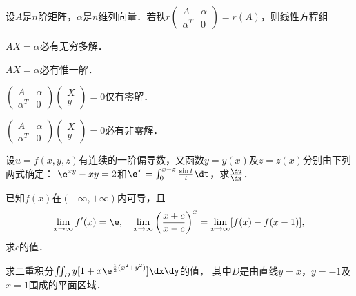 \documentclass[plain,noanswer,medmath]{../../template/jnuexam}
\begin{document}
\begin{problem}
设$A$是$n$阶矩阵，$\alpha$是$n$维列向量．若秩$r\begin{pmatrix}
         A & \alpha \\
  \alpha^T & 0
\end{pmatrix} = r(A)$，则线性方程组\pickout{}
\begin{abcd}
\item $AX = \alpha$必有无穷多解．
\item $AX = \alpha$必有惟一解．
\item $\begin{pmatrix}
         A & \alpha \\
  \alpha^T & 0
\end{pmatrix}\begin{pmatrix}
  X \\
  y
\end{pmatrix} = 0$仅有零解．
\item $\begin{pmatrix}
         A & \alpha \\
  \alpha^T & 0
\end{pmatrix}\begin{pmatrix}
  X \\
  y
\end{pmatrix} = 0$必有非零解．
\end{abcd}
\end{problem}





\begin{problem}
设$u = f(x,y,z)$有连续的一阶偏导数，又函数$y = y(x)$及$z = z(x)$分别由下列两式确定：
$\e^{xy} - xy = 2$和$\e^x = \int_0^{x - z} \frac{\sin t}{t} \dt$，求$\frac{\du}{\dx}$．
\end{problem}



\begin{problem}
已知$f(x)$在$(-\infty , +\infty)$内可导，且
$$\lim_{x \to \infty} f'(x) = \e,\quad
  \lim_{x \to \infty} \left(\frac{x + c}{x - c} \right)^x= \lim_{x \to \infty} [f(x) - f(x - 1)],$$
求$c$的值．
\end{problem}



\begin{problem}
求二重积分$\iint_D y[1 + x\e^{\frac{1}{2}(x^2 + y^2)}]\dx\dy$的值，
其中$D$是由直线$y = x$，$y = - 1$及$x = 1$围成的平面区域．
\end{problem}
\end{document}
